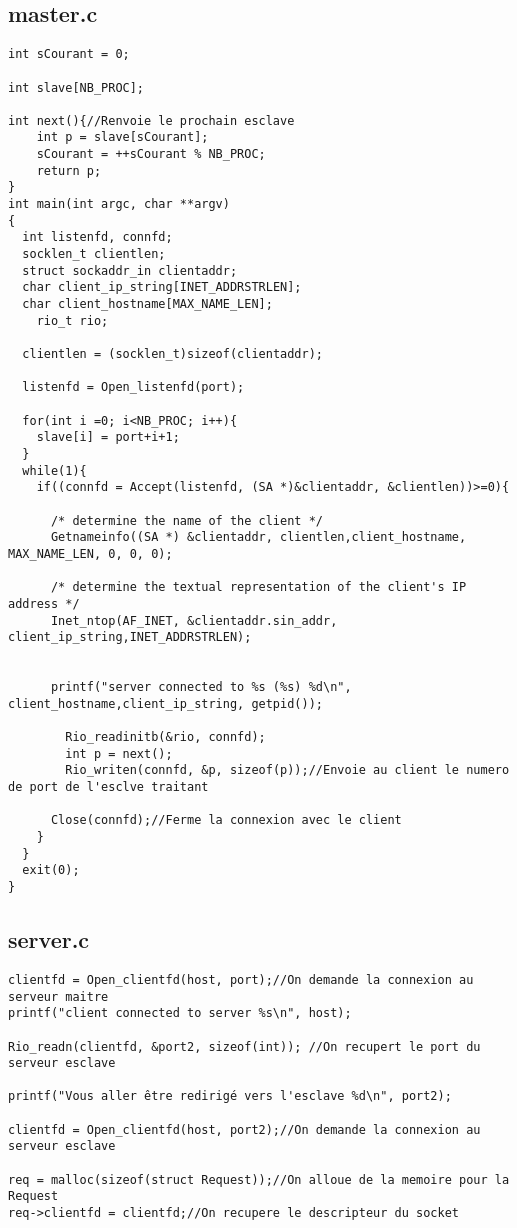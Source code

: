 \documentclass{report}
\begin{document}
      \subsection{master.c}
      \begin{lstlisting}
int sCourant = 0;

int slave[NB_PROC];

int next(){//Renvoie le prochain esclave
	int p = slave[sCourant];
	sCourant = ++sCourant % NB_PROC;
	return p;
}
int main(int argc, char **argv)
{
  int listenfd, connfd;
  socklen_t clientlen;
  struct sockaddr_in clientaddr;
  char client_ip_string[INET_ADDRSTRLEN];
  char client_hostname[MAX_NAME_LEN];
	rio_t rio;

  clientlen = (socklen_t)sizeof(clientaddr);

  listenfd = Open_listenfd(port);

  for(int i =0; i<NB_PROC; i++){
    slave[i] = port+i+1;
  }
  while(1){
    if((connfd = Accept(listenfd, (SA *)&clientaddr, &clientlen))>=0){

      /* determine the name of the client */
      Getnameinfo((SA *) &clientaddr, clientlen,client_hostname, MAX_NAME_LEN, 0, 0, 0);

      /* determine the textual representation of the client's IP address */
      Inet_ntop(AF_INET, &clientaddr.sin_addr, client_ip_string,INET_ADDRSTRLEN);


      printf("server connected to %s (%s) %d\n", client_hostname,client_ip_string, getpid());

  		Rio_readinitb(&rio, connfd);
  		int p = next();
  		Rio_writen(connfd, &p, sizeof(p));//Envoie au client le numero de port de l'esclve traitant

      Close(connfd);//Ferme la connexion avec le client
    }
  }
  exit(0);
}
      \end{lstlisting}
      \subsection{server.c}
      \begin{lstlisting}
clientfd = Open_clientfd(host, port);//On demande la connexion au serveur maitre
printf("client connected to server %s\n", host);

Rio_readn(clientfd, &port2, sizeof(int)); //On recupert le port du serveur esclave

printf("Vous aller être redirigé vers l'esclave %d\n", port2);

clientfd = Open_clientfd(host, port2);//On demande la connexion au serveur esclave

req = malloc(sizeof(struct Request));//On alloue de la memoire pour la Request
req->clientfd = clientfd;//On recupere le descripteur du socket
      \end{lstlisting}
\end{document}
